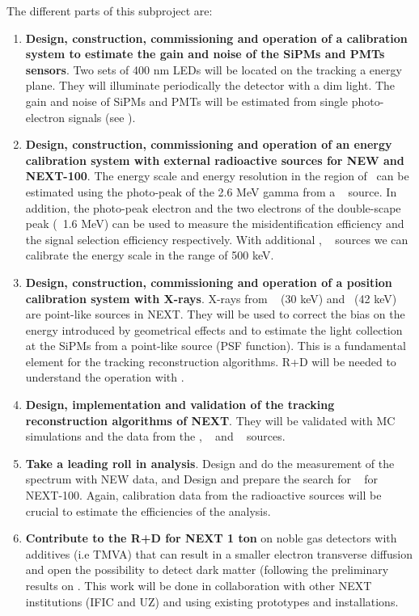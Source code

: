 The different parts of this subproject are:
\begin{enumerate}
\item {\bf Design, construction, commissioning and operation of a calibration system to estimate the gain and noise of the SiPMs and PMTs sensors}. Two sets of 400 nm LEDs will be located on the tracking a energy plane. They will illuminate periodically the detector with a dim light. The gain and noise of SiPMs and PMTs will be estimated from single photo-electron signals (see \cite{NEXT-DEMO}).

\item {\bf Design, construction, commissioning and operation of an energy calibration system with external radioactive sources for NEW and NEXT-100}.
The energy scale and energy resolution in the region of \Qbb ~can be estimated using the photo-peak of the 2.6 MeV gamma from a \Tl~  source. In addition, the photo-peak electron and the two electrons of the double-scape peak (~1.6 MeV) can be used to measure the misidentification efficiency and the signal selection efficiency respectively. With additional 
\NA,  \CS~ sources we can calibrate the energy scale in the range of 500 keV.

\item {\bf Design, construction, commissioning and operation of a position calibration system with X-rays}. X-rays from \Xe~ (30 keV) and \KR ~(42 keV) are point-like sources in NEXT.
They will be used to correct the bias on the energy introduced by geometrical effects and to estimate the light collection at the SiPMs from a point-like source (PSF function). This is a fundamental element for the tracking reconstruction algorithms. R+D will be needed to understand the operation with \KR.

\item {\bf Design, implementation and validation of the tracking reconstruction algorithms of NEXT}.  
They will be validated with MC simulations and the data from the \NA, \CS~  and \Tl~  sources.

\item {\bf Take a leading roll in analysis}. Design and do the measurement of the \bb~ spectrum with NEW data, and Design and prepare the search for \bbonu~  for NEXT-100. 
Again, calibration data from the radioactive sources will be crucial to estimate the efficiencies of the analysis.

\item {\bf Contribute to the R+D for NEXT 1 ton} on noble gas detectors with additives (i.e TMVA) that can result in a smaller electron transverse diffusion and open the possibility to detect dark matter (following the preliminary results on \cite{NEXT-DM)}. This work will be done in collaboration with other NEXT institutions (IFIC and UZ) and using existing prototypes and installations.
\end{enumerate}
